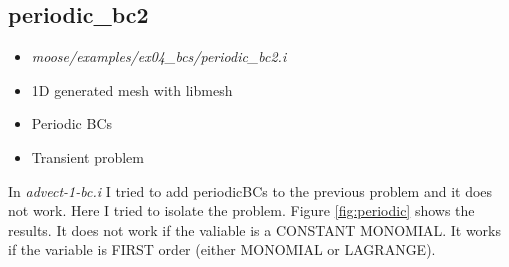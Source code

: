 \documentclass[11pt,letterpaper]{article}
\begin{document}
	\subsection{periodic\_bc2}

	\begin{itemize}
		\item \textit{moose/examples/ex04\_bcs/periodic\_bc2.i}
		\item 1D generated mesh with libmesh
		\item Periodic BCs
		\item Transient problem
	\end{itemize}

    In \textit{advect-1-bc.i} I tried to add periodicBCs to the previous problem and it does not work.
    Here I tried to isolate the problem.
    Figure \ref{fig:periodic} shows the results.
    It does not work if the valiable is a CONSTANT MONOMIAL.
    It works if the variable is FIRST order (either MONOMIAL or LAGRANGE).
\end{document}
